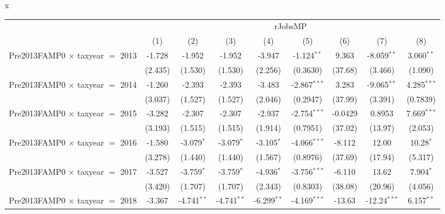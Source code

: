 x
\begingroup
\centering
\begin{tabular}{lcccccccc}
   \toprule
    & \multicolumn{8}{c}{rJobsMP}\\
                                           & (1)           & (2)            & (3)            & (4)            & (5)            & (6)           & (7)            & (8)\\  
   \midrule 
   Pre2013FAMP0 $\times$ taxyear $=$ 2013  & -1.728        & -1.952         & -1.952         & -3.947         & -1.124$^{**}$  & 9.363         & -8.059$^{**}$  & 3.060$^{**}$\\   
                                           & (2.435)       & (1.530)        & (1.530)        & (2.256)        & (0.3630)       & (37.68)       & (3.466)        & (1.090)\\   
   Pre2013FAMP0 $\times$ taxyear $=$ 2014  & -1.260        & -2.393         & -2.393         & -3.483         & -2.867$^{***}$ & 3.283         & -9.065$^{**}$  & 4.285$^{***}$\\   
                                           & (3.037)       & (1.527)        & (1.527)        & (2.046)        & (0.2947)       & (37.99)       & (3.391)        & (0.7839)\\   
   Pre2013FAMP0 $\times$ taxyear $=$ 2015  & -3.282        & -2.307         & -2.307         & -2.937         & -2.754$^{***}$ & -0.0429       & 0.8953         & 7.669$^{***}$\\   
                                           & (3.193)       & (1.515)        & (1.515)        & (1.914)        & (0.7951)       & (37.02)       & (13.97)        & (2.053)\\   
   Pre2013FAMP0 $\times$ taxyear $=$ 2016  & -1.580        & -3.079$^{*}$   & -3.079$^{*}$   & -3.105$^{*}$   & -4.066$^{***}$ & -8.112        & 12.00          & 10.28$^{*}$\\   
                                           & (3.278)       & (1.440)        & (1.440)        & (1.567)        & (0.8976)       & (37.69)       & (17.94)        & (5.317)\\   
   Pre2013FAMP0 $\times$ taxyear $=$ 2017  & -3.527        & -3.759$^{*}$   & -3.759$^{*}$   & -4.936$^{*}$   & -3.756$^{***}$ & -6.110        & 13.62          & 7.904$^{*}$\\   
                                           & (3.420)       & (1.707)        & (1.707)        & (2.343)        & (0.8303)       & (38.08)       & (20.96)        & (4.056)\\   
   Pre2013FAMP0 $\times$ taxyear $=$ 2018  & -3.367        & -4.741$^{**}$  & -4.741$^{**}$  & -6.299$^{**}$  & -4.169$^{***}$ & -13.63        & -12.24$^{***}$ & 6.157$^{**}$\\   

\end{tabular}
